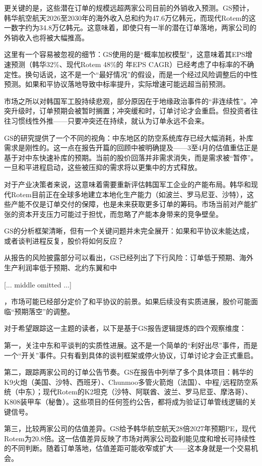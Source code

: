 \documentclass[11pt]{ctexart}
\begin{document}
更关键的是，这些潜在订单的规模远超两家公司目前的外销收入预测。GS预计，韩华航空航天2026至2030年的海外收入总和约为47.6万亿韩元，而现代Rotem的这一数字约为34.8万亿韩元。这意味着，即使只有一半的潜在订单落地，两家公司的外销收入也将被大幅推高。

这里有一个容易被忽视的细节：GS使用的是“概率加权模型”，这意味着其EPS增速预测（韩华32\%、现代Rotem 48\%的 年EPS CAGR）已经考虑了中标率的不确定性。换句话说，这不是一个“最好情况”的假设，而是一个经过风险调整后的中性预测。如果和平协议落地导致中标率提升，实际增速可能远超当前预测。

市场之所以对韩国军工股持续悲观，部分原因在于地缘政治事件的“非连续性”。冲突升级时，订单预期会被暂时搁置；冲突缓和时，订单讨论才会重启。但投资者往往习惯线性外推——只要冲突还在持续，就认为订单永远不会来。

GS的研究提供了一个不同的视角：中东地区的防空系统库存已经大幅消耗，补库需求是刚性的。这一点在报告开篇的回顾中被明确提及——3至4月的估值重估正是基于对中东快速补库的预期。当前的股价回落并非需求消失，而是需求被“暂停”。一旦和平进程启动，这些被压抑的需求将以更集中的方式释放。

对于产业决策者来说，这意味着需要重新评估韩国军工企业的产能布局。韩华和现代Rotem目前正在全球多地建立本地化生产能力（如波兰、罗马尼亚、沙特），这些产能不仅是订单交付的保障，也是未来获取更多订单的筹码。市场当前对产能扩张的资本开支压力可能过于担忧，而忽略了产能本身带来的竞争壁垒。

GS的分析框架清晰，但有一个关键问题并未完全展开：如果和平协议未能达成，或者谈判进程反复，股价将如何反应？

从报告的风险披露部分可以看出，GS已经列出了下行风险：订单低于预期、海外生产利润率低于预期、北约东翼和中

[... middle omitted ...]

，市场可能已经部分定价了和平协议的前景。如果后续没有实质进展，股价可能面临“预期落空”的调整。

对于希望跟踪这一主题的读者，以下是基于GS报告逻辑提炼的四个观察维度：

第一，关注中东和平谈判的实质性进展。这不是一个简单的“利好出尽”事件，而是一个“开关”事件。只有看到具体的谈判框架或停火协议，订单讨论才会正式重启。

第二，跟踪两家公司的订单公告节奏。GS在报告中列举了多个具体项目：韩华的K9火炮（美国、沙特、西班牙）、Chunmoo多管火箭炮（法国）、中程/远程防空系统（中东）；现代Rotem的K2坦克（沙特、阿联酋、波兰、罗马尼亚、摩洛哥）、K808装甲车（秘鲁）。这些项目的任何签约公告，都将成为验证订单管线逻辑的关键信号。

第三，比较两家公司的估值差异。GS给予韩华航空航天28倍2027年预期PE，现代Rotem为20.8倍。这一估值差异反映了市场对两家公司盈利能见度和增长可持续性的不同判断。随着订单落地，估值差距可能收窄或扩大——这本身就是一个交易机会。
\end{document}
